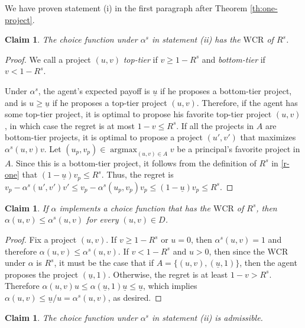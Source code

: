 \documentclass[12pt,english]{article}
\newcommand{\under}{\underline}
\DeclareMathOperator*{\argmax}{argmax}
\newcommand{\underu}{{\underline{u}}}
\newcommand{\eran}[1]{\begin{framed}{\noindent {\bf Eran:} #1}\end{framed}}
\theoremstyle{remark}
\theoremstyle{plain}
\newtheorem{claim}[theorem]{Claim}
\theoremstyle{definition}
\newcommand{\wcr}{\mathrm{WCR}}
\begin{document}
    We have proven statement (i) in the first paragraph after Theorem \ref{th:one-project}.  
   \begin{claim}
   The choice function under $\alpha^s$ in statement (ii) has the $\wcr$ of $R^s$.
   \end{claim}
  \begin{proof}We call a project $(u,v)$ \emph{top-tier} if $v\geqslant 1-R^s$ and \emph{bottom-tier} if $v<1-R^s$. 

Under $\alpha^s$, the agent's expected payoff is $\underu$ if he proposes a bottom-tier project, and is $u\geqslant \underu $ if he proposes a top-tier project $(u,v)$. Therefore, if the agent has some top-tier project, it is optimal to propose his favorite top-tier project $(u,v)$, in which case the regret is at most $1-v\leqslant R^s$. If all the projects in $A$ are bottom-tier projects, it is optimal to propose a project $(u',v')$ that maximizes $\alpha^s(u,v)v$. Let $(u_p,v_p)\in \argmax_{(u,v)\in A} v$ be a principal's favorite project in $A$. Since this is a bottom-tier project, it follows from the definition of $R^s$ in \eqref{r-one} that $(1-\under u)v_p \leqslant R^s$. Thus, the regret is $v_p- \alpha^s(u',v')v' \leqslant v_p-\alpha^s(u_p,v_p)v_p \leqslant (1-\underu)v_p\leqslant R^s$.
 \end{proof}
\begin{claim}If $\alpha$ implements a choice function that has the $\wcr$ of $R^s$, then $\alpha(u,v)\leqslant \alpha^s(u,v)$ for every $(u,v)\in D$.  \label{claim:lowerprob}
\end{claim}
\begin{proof}Fix a project $(u,v)$. If $v\geqslant1-R^s$ or $u=0$, then $\alpha^s(u,v)=1$ and therefore $\alpha(u,v)\leqslant \alpha^s(u,v)$. If $v<1-R^s$ and $u>0$, then since the $\wcr$ under $\alpha$ is $R^s$, it must be the case that if $A=\{(u,v), (\under u,1)\}$, then the agent proposes the project $(\underu, 1)$. Otherwise, the regret is at least $1-v>R^s$. Therefore $\alpha(u,v)u\leqslant \alpha(\under u,1)\under u\leqslant \under u$, which implies $\alpha(u,v)\leqslant \underu/u=\alpha^s(u,v)$, as desired.\end{proof}
\begin{claim} 
The choice function under $\alpha^s$ in statement (ii) is admissible.
\end{claim}
\end{document}
